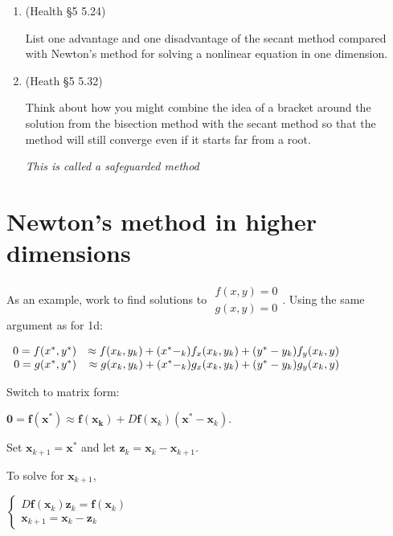 \documentclass[12pt,letterpaper,noanswers]{exam}
\begin{document}
\begin{enumerate}[resume]
\item (Health \S5 5.24)

List one advantage and one disadvantage of the secant method compared with Newton's method for solving a nonlinear equation in one dimension.
\vspace{0.5in}

\item (Heath \S5 5.32) 

Think about how you might combine the idea of  a bracket around the solution from the bisection method with the secant method so that the method will still converge even if it starts far from a root.

\emph{This is called a safeguarded method}

\vspace{0.5in}
\end{enumerate}

\section*{Newton's method in higher dimensions}

As an example, work to find solutions to $\begin{array}{r} f(x,y) = 0 \\ g(x,y) = 0 \end{array}$.  Using the same argument as for 1d:

$\begin{array}{r r} 0 = f(x^*,y^*)&\approx f(x_k,y_k) + (x^*-_k)f_x(x_k,y_k) + (y^*-y_k)f_y(x_k,y)\\ 0 =g(x^*,y^*) & \approx g(x_k,y_k) + (x^*-_k)g_x(x_k,y_k) + (y^*-y_k)g_y(x_k,y)\end{array} \begin{array}{r}  \\  \end{array}$

Switch to matrix form:

$\mathbf{0} = \mathbf{f}(\mathbf{x^*})\approx \mathbf{f}(\mathbf{x_k}) + D\mathbf{f}(\mathbf{x}_k)(\mathbf{x^*}-\mathbf{x}_k)$.


Set $\mathbf{x}_{k+1} = \mathbf{x}^*$ and let $\mathbf{z}_k = \mathbf{x}_k-\mathbf{x}_{k+1}.$

To solve for $\mathbf{x}_{k+1}$,

$\left\{\begin{array}{l} D\mathbf{f}(\mathbf{x}_k)\mathbf{z}_k = \mathbf{f}(\mathbf{x}_k) \\\mathbf{x}_{k+1} = \mathbf{x}_k - \mathbf{z}_k\end{array}\right.$
\end{document}
